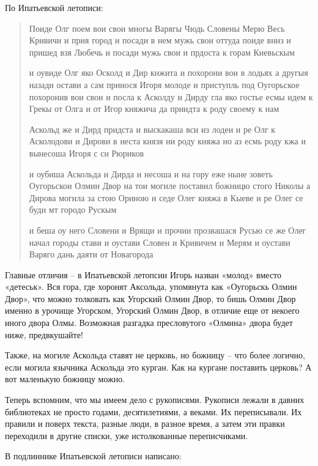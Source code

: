 По Ипатьевской летописи: 

\begin{quotation}
Поиде Олг поем вои свои многы Варягы Чюдь Словены Мерю Весь Кривичи и прия город и посади в нем мужь свои оттуда поиде вниз и пришед взя Любечь и посади мужь свои и прдоста к горам Киевьскым 

и оувиде Олг яко Осколд и Дир кнжита и похорони вои в лодьях а другыя назади остави а сам принося Игоря молоде и приступль под Оугорьское похоронив вои свои и посла к Асколду и Дирду гла яко гостье есмы идем к Грекы от Олга и от Игор княжича да приидта к роду своему к нам 

Аскольд же и Дирд придста и выскакаша вси из лодеи и ре Олг к Асколодови и Дирови в неста князя ни роду княжа но аз есмь роду кжа и вынесоша Игоря с сн Рюриков

и оубиша Аскольда и Дирда и несоша и на гору еже ныне зоветь Оугорьскои Олмин Двор на тои могиле поставил божницю стого Николы а Дирова могила за стою Ориною и седе Олег княжа в Кыеве и ре Олег се буди мт городо Рускым 

и беша оу него Словени и Врящи и прочии прозвашася Русью се же Олег начал городы стави и оустави Словен и Кривичем и Мерям и оустави Варяго дань даяти от Новагорода
\end{quotation}

Главные отличия – в Ипатьевской летопсии Игорь назван «молод» вместо «детеськ». Вся гора, где хоронят Аксольда, упомянута как «Оугорьскь Олмин Двор», что можно толковать как Угорский Олмин Двор, то бишь Олмин Двор именно в урочище Угорском, Угорский Олмин Двор, в отличие еще от некоего иного двора Олмы. Возможная разгадка пресловутого «Олмина» двора будет ниже, предвкушайте!

Также, на могиле Аскольда ставят не церковь, но божницу – что более логично, если могила язычника Аскольда это курган. Как на кургане поставить церковь? А вот маленькую божницу можно.

Теперь вспомним, что мы имеем дело с рукописями. Рукописи лежали в давних библиотеках не просто годами, десятилетиями, а веками. Их переписывали. Их правили и поверх текста, разные люди, в разное время, а затем эти правки переходили в другие списки, уже истолкованные переписчиками.

В подлиннике Ипатьевской летописи написано:

